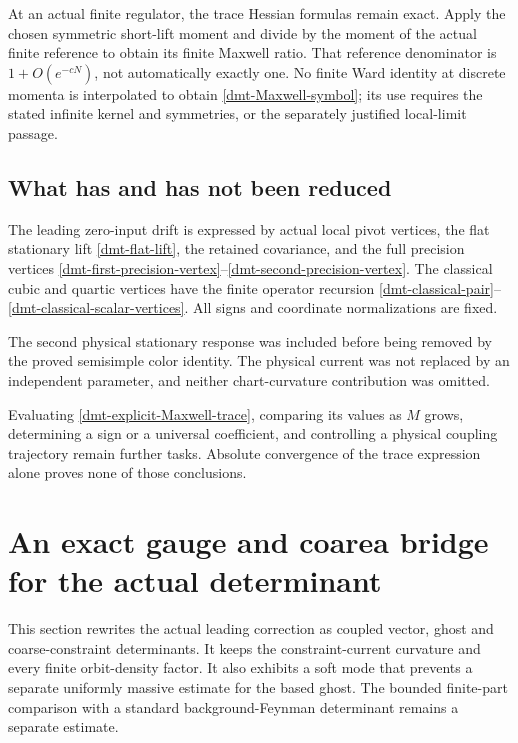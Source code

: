 \documentclass[11pt]{article}
\theoremstyle{remark}
\begin{document}
At an actual finite regulator, the trace Hessian formulas
remain exact. Apply the chosen symmetric short-lift
moment and divide by the moment of the actual finite
reference to obtain its finite Maxwell ratio. That
reference denominator is \(1+O(e^{-cN})\), not
automatically exactly one. No finite Ward identity at
discrete momenta is interpolated to obtain
\eqref{dmt-Maxwell-symbol}; its use requires the stated
infinite kernel and symmetries, or the separately
justified local-limit passage.

\subsection{What has and has not been reduced}
\label{dmt-scope-section}

The leading zero-input drift is expressed by actual local
pivot vertices, the flat stationary lift
\eqref{dmt-flat-lift}, the retained covariance, and the
full precision vertices
\eqref{dmt-first-precision-vertex}--\eqref{dmt-second-precision-vertex}.
The classical cubic and quartic vertices have the finite
operator recursion
\eqref{dmt-classical-pair}--\eqref{dmt-classical-scalar-vertices}.
All signs and coordinate normalizations are fixed.

The second physical stationary response was included
before being removed by the proved semisimple color
identity. The physical current was not replaced by an
independent parameter, and neither chart-curvature
contribution was omitted.

Evaluating \eqref{dmt-explicit-Maxwell-trace}, comparing
its values as \(M\) grows, determining a sign or a
universal coefficient, and controlling a physical
coupling trajectory remain further tasks. Absolute
convergence of the trace expression alone proves none
of those conclusions.


\section{An exact gauge and coarea bridge for the actual determinant}
\label{dgb-section}

This section rewrites the actual leading correction as coupled
vector, ghost and coarse-constraint determinants. It keeps the
constraint-current curvature and every finite orbit-density factor.
It also exhibits a soft mode that prevents a separate uniformly
massive estimate for the based ghost. The bounded finite-part
comparison with a standard background-Feynman determinant remains
a separate estimate.
\end{document}

